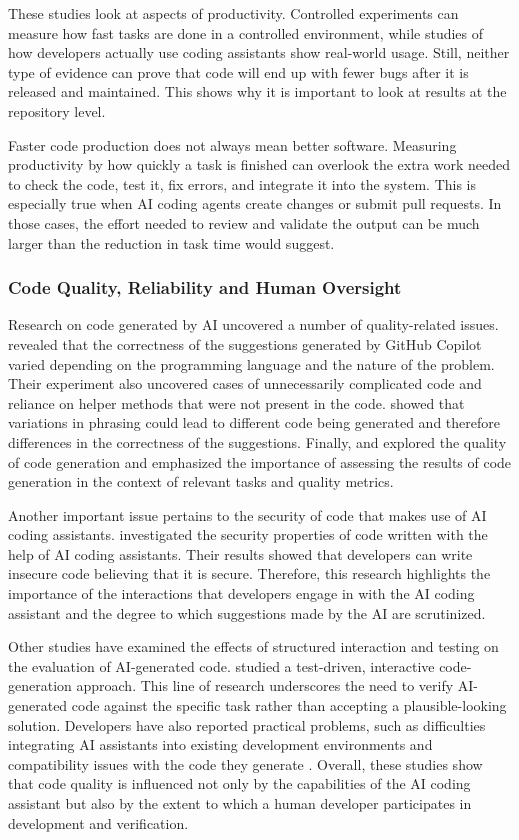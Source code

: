 \documentclass[stu,12pt,donotrepeattitle]{apa7}
\begin{document}
These studies look at aspects of productivity. Controlled experiments can measure how fast tasks are done in a controlled environment, while studies of how developers actually use coding assistants show real-world usage. Still, neither type of evidence can prove that code will end up with fewer bugs after it is released and maintained. This shows why it is important to look at results at the repository level.

Faster code production does not always mean better software. Measuring productivity by how quickly a task is finished can overlook the extra work needed to check the code, test it, fix errors, and integrate it into the system. This is especially true when AI coding agents create changes or submit pull requests. In those cases, the effort needed to review and validate the output can be much larger than the reduction in task time would suggest.

\subsubsection{Code Quality, Reliability and Human Oversight}

Research on code generated by AI uncovered a number of quality-related issues. \textcite{nguyen2022} revealed that the correctness of the suggestions generated by GitHub Copilot varied depending on the programming language and the nature of the problem. Their experiment also uncovered cases of unnecessarily complicated code and reliance on helper methods that were not present in the code. \textcite{mastropaolo2023} showed that variations in phrasing could lead to different code being generated and therefore differences in the correctness of the suggestions. Finally, \textcite{liu2024} and \textcite{tosi2024} explored the quality of code generation and emphasized the importance of assessing the results of code generation in the context of relevant tasks and quality metrics.

Another important issue pertains to the security of code that makes use of AI coding assistants. \textcite{perry2023} investigated the security properties of code written with the help of AI coding assistants. Their results showed that developers can write insecure code believing that it is secure. Therefore, this research highlights the importance of the interactions that developers engage in with the AI coding assistant and the degree to which suggestions made by the AI are scrutinized.

Other studies have examined the effects of structured interaction and testing on the evaluation of AI-generated code. \textcite{fakhoury2024} studied a test-driven, interactive code-generation approach. This line of research underscores the need to verify AI-generated code against the specific task rather than accepting a plausible-looking solution. Developers have also reported practical problems, such as difficulties integrating AI assistants into existing development environments and compatibility issues with the code they generate \parencite{zhang2023,zhou2025}. Overall, these studies show that code quality is influenced not only by the capabilities of the AI coding assistant but also by the extent to which a human developer participates in development and verification.
\end{document}

